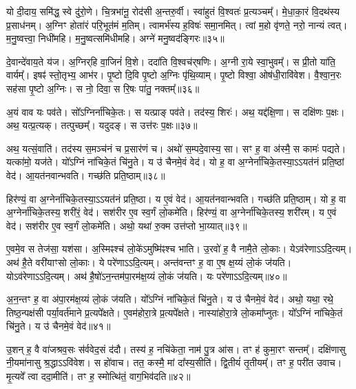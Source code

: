    यो दी॒दाय॒ समि॑द्ध॒ स्वे दु॑रो॒णे।
   चि॒त्रभा॑नू॒ रोद॑सी अ॒न्तरु॒र्वी।
   स्वा॑हुतं वि॒श्वतः॑ प्र॒त्यञ्चम्᳚।
   मे॒धा॒का॒रं वि॒दथ॑स्य प्र॒साध॑नम्।
   अ॒ग्निꣳ होता॑रं परि॒भूत॑मं म॒तिम्।
   त्वामर्भ॑स्य ह॒विषः॑ समा॒नमित्।
   त्वां म॒हो वृ॑णते॒ नरो॒ नान्यं त्वत्।
   म॒नु॒ष्वत्त्वा॒ निधी॑महि।
   म॒नु॒ष्वत्समि॑धीमहि।
   अग्ने॑ मनु॒ष्वद॑ङ्गिरः॥३५॥

   दे॒वान्दे॑वाय॒ते य॑ज।
   अ॒ग्निर्{‌}हि वा॒जिनं॑ वि॒शे।
   ददा॑ति वि॒श्वच॑र्{‌}षणिः।
   अ॒ग्नी रा॒ये स्वा॒भुवम्᳚।
   स प्री॒तो या॑ति॒ वार्यम्᳚।
   इषꣴ॑ स्तो॒तृभ्य॒ आभ॑र।
   पृ॒ष्टो दि॒वि पृ॒ष्टो अ॒ग्निः पृ॑थि॒व्याम्।
   पृ॒ष्टो विश्वा॒ ओष॑धी॒रावि॑वेश।
   वै॒श्वा॒न॒रः सह॑सा पृ॒ष्टो अ॒ग्निः।
   स नो॒ दिवा॒ स रि॒षः पा॑तु॒ नक्तम्᳚॥३६॥
\anuvakamend
  
   अ॒यं वाव यः पव॑ते।
   सो᳚ऽग्निर्ना॑चिके॒तः।
   स यत्प्राङ् पव॑ते।
   तद॑स्य॒ शिरः॑।
   अथ॒ यद्द॑क्षि॒णा।
   स दक्षि॑णः प॒क्षः।
   अथ॒ यत्प्र॒त्यक्।
   तत्पुच्छम्᳚।
   यदुदङ्{‌}\sG{}।
   स उत्त॑रः प॒क्षः॥३७॥

   अथ॒ यत्सं॒वाति॑।
   तद॑स्य स॒मञ्च॑नं च प्र॒सार॑णं च।
   अथो॑ स॒म्पदे॒वास्य॒ सा।
   सꣳ ह॒ वा अ॑स्मै॒ स कामः॑ पद्यते।
   यत्का॑मो॒ यज॑ते।
   यो᳚ऽग्निं ना॑चिके॒तं चि॑नु॒ते।
   य उ॑ चैनमे॒वं वेद॑।
   यो ह॒ वा अ॒ग्नेर्ना॑चिके॒तस्या॒ऽऽयत॑नं प्रति॒ष्ठां वेद॑।
   आ॒यत॑नवान्भवति।
   गच्छ॑ति प्रति॒ष्ठाम्॥३८॥

   हिर॑ण्यं॒ वा अ॒ग्नेर्ना॑चिके॒तस्या॒ऽऽयत॑नं प्रति॒ष्ठा।
   य ए॒वं वेद॑।
   आ॒यत॑नवान्भवति।
   गच्छ॑ति प्रति॒ष्ठाम्।
   यो ह॒ वा अ॒ग्नेर्ना॑चिके॒तस्य॒ शरी॑रं॒ वेद॑।
   सश॑रीर ए॒व स्व॒र्गं लो॒कमे॑ति।
   हिर॑ण्यं॒ वा अ॒ग्नेर्ना॑चिके॒तस्य॒ शरी॑रम्।
   य ए॒वं वेद॑।
   सश॑रीर ए॒व स्व॒र्गं लो॒कमे॑ति।
   अथो॒ यथा॑ रु॒क्म उत्त॑प्तो भा॒य्यात्॥३९॥

   ए॒वमे॒व स तेज॑सा॒ यश॑सा।
   अ॒स्मिꣴश्च॑ लो॒के॑ऽमुष्मि॑ꣴश्च भाति।
   उ॒रवो॑ ह॒ वै नामै॒ते लो॒काः।
   येऽव॑रेणाऽऽदि॒त्यम्।
   अथ॑ है॒ते वरी॑याꣳसो लो॒काः।
   ये परे॑णाऽऽदि॒त्यम्।
   अन्त॑वन्तꣳ ह॒ वा ए॒ष क्ष॒य्यं लो॒कं ज॑यति।
   योऽव॑रेणाऽऽदि॒त्यम्।
   अथ॑ है॒षो॑ऽन॒न्तम॑पा॒रम॑क्ष॒य्यं लो॒कं ज॑यति।
   यः परे॑णाऽऽदि॒त्यम्॥४०॥
   
   अ॒न॒न्तꣳ ह॒ वा अ॑पा॒रम॑क्ष॒य्यं लो॒कं ज॑यति।
   यो᳚ऽग्निं ना॑चिके॒तं चि॑नु॒ते।
   य उ॑ चैनमे॒वं वेद॑।
   अथो॒ यथा॒ रथे॒ तिष्ठ॒न्पक्ष॑सी पर्या॒वर्त॑माने प्र॒त्यपे᳚क्षते।
   ए॒वम॑होरा॒त्रे प्र॒त्यपे᳚क्षते।
   नास्या॑होरा॒त्रे लो॒कमा᳚प्नुतः।
   यो᳚ऽग्निं ना॑चिके॒तं चि॑नु॒ते।
   य उ॑ चैनमे॒वं वेद॑॥४१॥
\anuvakamend
  
   उ॒शन् ह॒ वै वा॑जश्रव॒सः स॑र्ववेद॒सं द॑दौ।
   तस्य॑ ह॒ नचि॑केता॒ नाम॑ पु॒त्र आ॑स।
   तꣳ ह॑ कुमा॒रꣳ सन्तम्᳚।
   दक्षि॑णासु नी॒यमा॑नासु श्र॒द्धाऽऽवि॑वेश।
   स हो॑वाच।
   तत॒ कस्मै॒ मां दा᳚स्य॒सीति॑।
   द्वि॒तीयं॑ तृ॒तीयम्᳚।
   तꣳ ह॒ परी॑त उवाच।
   मृ॒त्यवे᳚ त्वा ददा॒मीति॑।
   तꣳ ह॒ स्मोत्थि॑तं॒ वाग॒भिव॑दति॥४२॥

